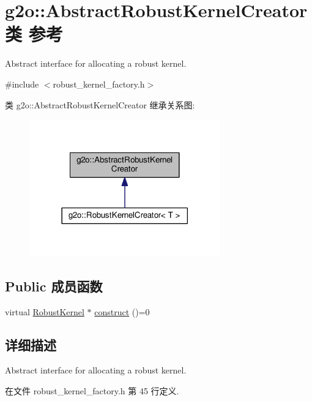 \hypertarget{classg2o_1_1AbstractRobustKernelCreator}{\section{g2o\-:\-:Abstract\-Robust\-Kernel\-Creator类 参考}
\label{classg2o_1_1AbstractRobustKernelCreator}
}


Abstract interface for allocating a robust kernel.  




{\ttfamily \#include $<$robust\-\_\-kernel\-\_\-factory.\-h$>$}



类 g2o\-:\-:Abstract\-Robust\-Kernel\-Creator 继承关系图\-:
\nopagebreak
\begin{figure}[H]
\begin{center}
\leavevmode
\includegraphics[width=234pt]{classg2o_1_1AbstractRobustKernelCreator__inherit__graph}
\end{center}
\end{figure}
\subsection*{Public 成员函数}
\begin{DoxyCompactItemize}
\item 
virtual \hyperlink{classg2o_1_1RobustKernel}{Robust\-Kernel} $\ast$ \hyperlink{classg2o_1_1AbstractRobustKernelCreator_a3022ab9279e52151d37f8cb4d1524d47}{construct} ()=0
\end{DoxyCompactItemize}


\subsection{详细描述}
Abstract interface for allocating a robust kernel. 

在文件 robust\-\_\-kernel\-\_\-factory.\-h 第 45 行定义.



